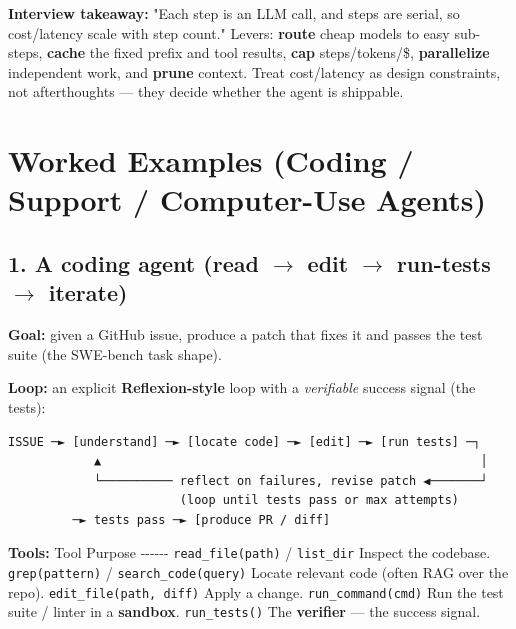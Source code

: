 \documentclass[11pt]{article}
\begin{document}
\textbf{Interview takeaway:} "Each step is an LLM call, and steps are serial, so cost/latency scale with step count." Levers: \textbf{route} cheap models to easy sub-steps, \textbf{cache} the fixed prefix and tool results, \textbf{cap} steps/tokens/\$, \textbf{parallelize} independent work, and \textbf{prune} context. Treat cost/latency as design constraints, not afterthoughts --- they decide whether the agent is shippable.

\section{Worked Examples (Coding / Support / Computer-Use Agents)}\label{worked-examples-coding--support--computer-use-agents}

\subsection{\texorpdfstring{1. A coding agent (read \(\rightarrow\) edit \(\rightarrow\) run-tests \(\rightarrow\) iterate)}{1. A coding agent (read \textbackslash rightarrow edit \textbackslash rightarrow run-tests \textbackslash rightarrow iterate)}}\label{1-a-coding-agent-read-rightarrow-edit-rightarrow-run-tests-rightarrow-iterate}

\textbf{Goal:} given a GitHub issue, produce a patch that fixes it and passes the test suite (the SWE-bench task shape).

\textbf{Loop:} an explicit \textbf{Reflexion-style} loop with a \emph{verifiable} success signal (the tests):

\setcodelang{}

\begin{verbatim}
ISSUE ─► [understand] ─► [locate code] ─► [edit] ─► [run tests] ─┐
            ▲                                                     │
            └────────── reflect on failures, revise patch ◀───────┘
                        (loop until tests pass or max attempts)
         ─► tests pass ─► [produce PR / diff]
\end{verbatim}

\textbf{Tools:}
\textbar{} Tool \textbar{} Purpose \textbar{}
\textbar-\/-\/-\textbar-\/-\/-\textbar{}
\textbar{} \texttt{read\_file(path)} / \texttt{list\_dir} \textbar{} Inspect the codebase. \textbar{}
\textbar{} \texttt{grep(pattern)} / \texttt{search\_code(query)} \textbar{} Locate relevant code (often RAG over the repo). \textbar{}
\textbar{} \texttt{edit\_file(path,\ diff)} \textbar{} Apply a change. \textbar{}
\textbar{} \texttt{run\_command(cmd)} \textbar{} Run the test suite / linter in a \textbf{sandbox}. \textbar{}
\textbar{} \texttt{run\_tests()} \textbar{} The \textbf{verifier} --- the success signal. \textbar{}
\end{document}
